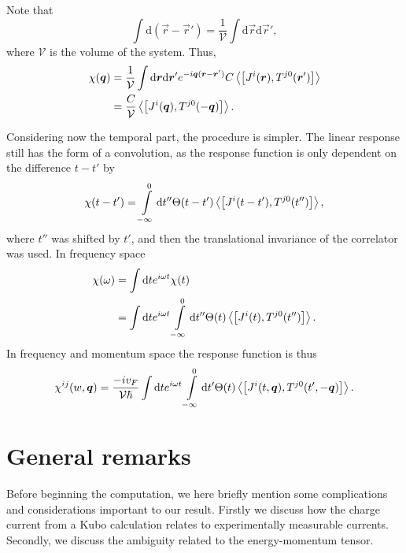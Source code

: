 Note that
\begin{equation}
  \int \mathrm{d}(\vec{r} - \vec{r}') = \frac{1}{\mathcal{V}} \int \mathrm{d}\vec{r} \mathrm{d} \vec{r}',
\end{equation}
where $\mathcal{V}$ is the volume of the system.
Thus,
\begin{equation}
  \begin{split}
    \chi (\vec{q}) &= \frac{1}{\mathcal{V}} \int \mathrm{d}\vec{r} \mathrm{d}\vec{r}'
    e^{-i\vec{q}(\vec{r}-\vec{r}')}
    C \Braket{\left[
        J^i(\vec{r}), T^{j 0}(\vec{r}')
      \right]}\\
    &= \frac{C}{\mathcal{V}} \Braket{\left[ J^i(\vec{q}), T^{j 0}(-\vec{q}) \right]}.
  \end{split}
\end{equation}

Considering now the temporal part, the procedure is simpler.
The linear response still has the form of a convolution, as the response function is only dependent on the difference $t-t'$ by
\begin{equation}
  \chi (t-t') = \int\limits_{-\infty }^0 \mathrm{d} t'' \Theta (t - t')
  \Braket{\left[ J^i(t-t'), T^{j0}(t'') \right]},
\end{equation}
where $t''$ was shifted by $t' $, and then the translational invariance of the correlator was used.
In frequency space
\begin{align}
  \chi (\omega ) &= \int \mathrm{d} t e^{i \omega  t} \chi (t)\\
                 &= \int \mathrm{d} t e^{i \omega  t} \int\limits_{-\infty  }^0 \mathrm{d} t''
                   \Theta (t) \Braket{\left[ J^i(t), T^{j 0}(t'') \right]}.
\end{align}
In frequency and momentum space the response function is thus
\begin{equation}\label{eq:22}
  \chi ^{ij} (w, \vec{q}) =
  \frac{-iv_F}{\mathcal{V} \hbar }
  \int \mathrm{d}t e^{i\omega t}
  \int\limits_{-\infty }^{0} \mathrm{d}t'
  \Theta (t)
  \Braket{\left[
      J^i(t, \vec{q}), T^{j 0}(t', -\vec{q})
    \right]}.
\end{equation}

\section{General remarks}
Before beginning the computation, we here briefly mention some complications and considerations important to our result.
Firstly we discuss how the charge current from a Kubo calculation relates to experimentally measurable currents.
Secondly, we discuss the ambiguity related to the energy-momentum tensor.

